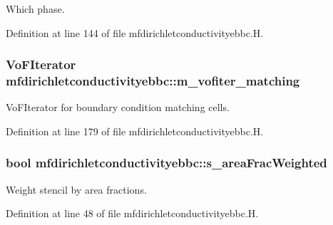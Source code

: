 Which phase. 



Definition at line 144 of file mfdirichletconductivityebbc.\+H.

\subsubsection[{\texorpdfstring{m\+\_\+vofiter\+\_\+matching}{m_vofiter_matching}}]{\setlength{\rightskip}{0pt plus 5cm}Vo\+F\+Iterator mfdirichletconductivityebbc\+::m\+\_\+vofiter\+\_\+matching\hspace{0.3cm}{\ttfamily [protected]}}\hypertarget{classmfdirichletconductivityebbc_a220d4443c492a83456af24aa34a2457c}{}\label{classmfdirichletconductivityebbc_a220d4443c492a83456af24aa34a2457c}


Vo\+F\+Iterator for boundary condition matching cells. 



Definition at line 179 of file mfdirichletconductivityebbc.\+H.

\subsubsection[{\texorpdfstring{s\+\_\+area\+Frac\+Weighted}{s_areaFracWeighted}}]{\setlength{\rightskip}{0pt plus 5cm}bool mfdirichletconductivityebbc\+::s\+\_\+area\+Frac\+Weighted\hspace{0.3cm}{\ttfamily [static]}}\hypertarget{classmfdirichletconductivityebbc_a3304da845510beff0a8a6312c1806eb6}{}\label{classmfdirichletconductivityebbc_a3304da845510beff0a8a6312c1806eb6}


Weight stencil by area fractions. 



Definition at line 48 of file mfdirichletconductivityebbc.\+H.


